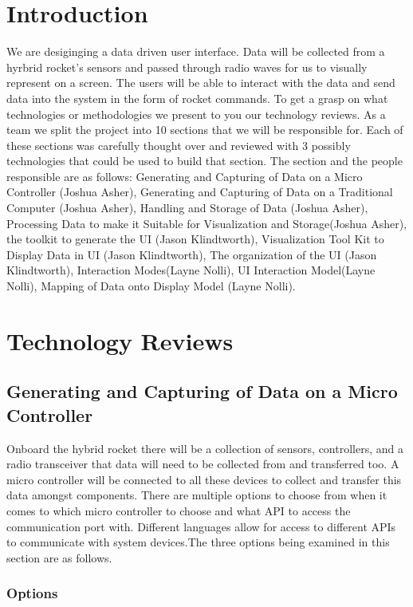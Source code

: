 \documentclass[10pt,draftclsnofoot,onecolumn,retainorgcmds]{IEEEtran}
\begin{document}
\section{Introduction}
We are desiginging a data driven user interface. Data will be collected from a hyrbrid rocket's sensors and passed through radio waves for us to visually represent on a screen. The users will be able to interact with the data and send data into the system in the form of rocket commands. To get a grasp on what technologies or methodologies we present to you our technology reviews. As a team we split the project into 10 sections that we will be responsible for. Each of these sections was carefully thought over and reviewed with 3 possibly technologies that could be used to build that section. The section and the people responsible are as follows: Generating and Capturing of Data on a Micro Controller (Joshua Asher), Generating and Capturing of Data on a Traditional Computer (Joshua Asher), Handling and Storage of Data (Joshua Asher), Processing Data to make it Suitable for Visualization and Storage(Joshua Asher), the toolkit to generate the UI (Jason Klindtworth), Visualization Tool Kit to Display Data in UI (Jason Klindtworth), The organization of the UI (Jason Klindtworth), Interaction Modes(Layne Nolli), UI Interaction Model(Layne Nolli), Mapping of Data onto Display Model (Layne Nolli). 

\section{Technology Reviews}
\subsection{Generating and Capturing of Data on a Micro Controller}
Onboard the hybrid rocket there will be a collection of sensors, controllers, and a radio transceiver that data will need to be collected from and transferred too. A micro controller will be connected to all these devices to collect and transfer this data amongst components. There are multiple options to choose from when it comes to which micro controller to choose and what API to access the communication port with. Different languages allow for access to different APIs to communicate with system devices.The three options being examined in this section are as follows. \\
\subsubsection{Options}
\end{document}
